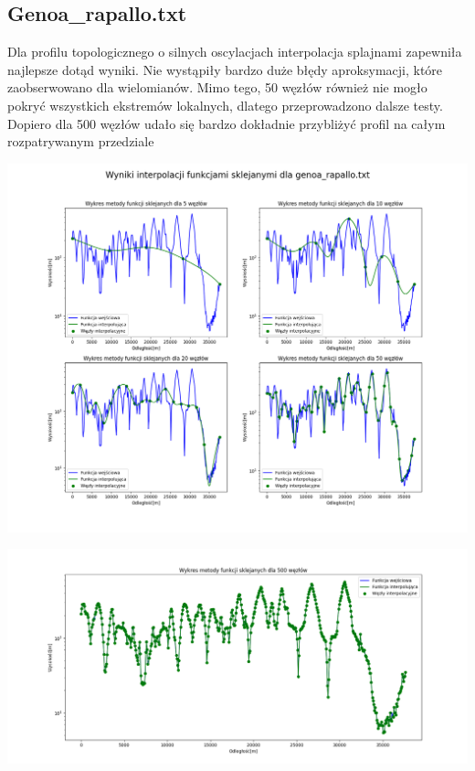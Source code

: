 \documentclass[a4paper,12pt]{article}
\begin{document}
   	\subsection{Genoa\_rapallo.txt}
	Dla profilu topologicznego o silnych oscylacjach interpolacja splajnami zapewniła najlepsze dotąd wyniki. Nie wystąpiły bardzo duże błędy aproksymacji, które zaobserwowano dla wielomianów. Mimo tego, 50 węzłów również nie mogło pokryć wszystkich ekstremów lokalnych, dlatego przeprowadzono dalsze testy. Dopiero dla 500 węzłów udało się bardzo dokładnie przybliżyć profil na całym rozpatrywanym przedziale
	\begin{center}
        \includegraphics[scale=0.4]{../charts/cubic_spline_genoa_rapallo.png}
    \end{center}
    \begin{center}
        \includegraphics[scale=0.4]{../charts/cubic_spline_500_genoa_rapallo.png}
    \end{center}
    
\end{document}
